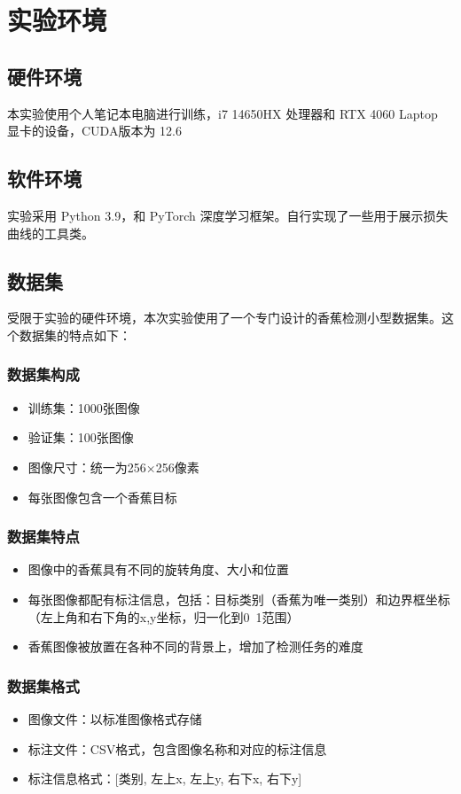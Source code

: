 \documentclass[UTF8]{ctexart}
\begin{document}
\section{实验环境}
\subsection{硬件环境}
本实验使用个人笔记本电脑进行训练，i7 14650HX 处理器和 RTX 4060 Laptop 显卡的设备，CUDA版本为 12.6

\subsection{软件环境}
实验采用 Python 3.9，和 PyTorch 深度学习框架。自行实现了一些用于展示损失曲线的工具类。

\subsection{数据集}

受限于实验的硬件环境，本次实验使用了一个专门设计的香蕉检测小型数据集。这个数据集的特点如下：

\subsubsection{数据集构成}
\begin{itemize}
    \item 训练集：1000张图像
    \item 验证集：100张图像
    \item 图像尺寸：统一为256×256像素
    \item 每张图像包含一个香蕉目标
\end{itemize}
\subsubsection{数据集特点}
\begin{itemize}
    \item 图像中的香蕉具有不同的旋转角度、大小和位置
    \item 每张图像都配有标注信息，包括：目标类别（香蕉为唯一类别）和边界框坐标（左上角和右下角的x,y坐标，归一化到0~1范围）
    \item 香蕉图像被放置在各种不同的背景上，增加了检测任务的难度
\end{itemize}
\subsubsection{数据集格式}
\begin{itemize}
    \item 图像文件：以标准图像格式存储
    \item 标注文件：CSV格式，包含图像名称和对应的标注信息
    \item 标注信息格式：[类别, 左上x, 左上y, 右下x, 右下y]
\end{itemize}
\end{document}
